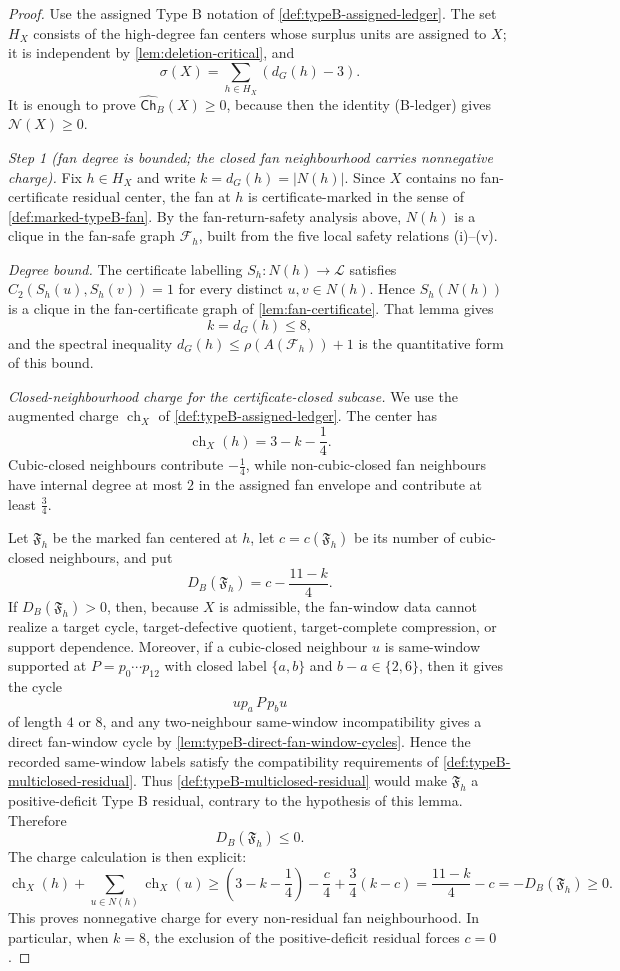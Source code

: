 \documentclass[11pt]{article}
\newcommand{\labels}{\mathcal L}
\newcommand{\ch}{\operatorname{ch}}
\newcommand{\Ch}{\mathsf{Ch}}
\newcommand{\No}{\mathcal N}
\newcommand{\Fsafe}{\mathcal F}
\begin{document}
\begin{proof}
Use the assigned Type B notation of \cref{def:typeB-assigned-ledger}.  The set
$H_X$ consists of the high-degree fan centers whose surplus units are assigned
to $X$; it is independent by \cref{lem:deletion-critical}, and
\[
\sigma(X)=\sum_{h\in H_X}(d_G(h)-3).
\]
It is enough to prove $\widehat{\Ch}_B(X)\ge0$, because then the identity
\textup{(B-ledger)} gives $\No(X)\ge0$.

\emph{Step 1 (fan degree is bounded; the closed fan neighbourhood carries nonnegative charge).}
Fix $h\in H_X$ and write $k=d_G(h)=|N(h)|$.  Since $X$ contains no
fan-certificate residual center, the fan at $h$ is certificate-marked in the
sense of \cref{def:marked-typeB-fan}.  By the fan-return-safety analysis above,
$N(h)$ is a clique in the fan-safe graph $\Fsafe_h$, built from the five local
safety relations (i)--(v).

\emph{Degree bound.}  The certificate labelling
$S_h:N(h)\to\labels$ satisfies $C_2(S_h(u),S_h(v))=1$ for every distinct
$u,v\in N(h)$.  Hence $S_h(N(h))$ is a clique in the fan-certificate graph of
\cref{lem:fan-certificate}.  That lemma gives
\[
k=d_G(h)\le 8 ,
\]
and the spectral inequality
$d_G(h)\le\rho(A(\Fsafe_h))+1$ is the quantitative form of this bound.

\emph{Closed-neighbourhood charge for the certificate-closed subcase.}  We use
the augmented charge $\ch_X$ of \cref{def:typeB-assigned-ledger}.  The center
has
\[
\ch_X(h)=3-k-\frac14.
\]
Cubic-closed neighbours contribute $-\tfrac14$, while non-cubic-closed fan
neighbours have internal degree at most $2$ in the assigned fan envelope and
contribute at least $\tfrac34$.

Let $\mathfrak F_h$ be the marked fan centered at $h$, let
$c=c(\mathfrak F_h)$ be its number of cubic-closed neighbours, and put
\[
D_B(\mathfrak F_h)=c-\frac{11-k}{4}.
\]
If $D_B(\mathfrak F_h)>0$, then, because $X$ is admissible, the fan-window data
cannot realize a target cycle, target-defective quotient, target-complete
compression, or support dependence.  Moreover, if a cubic-closed neighbour $u$ is
same-window supported at $P=p_0\cdots p_{12}$ with closed label
$\{a,b\}$ and $b-a\in\{2,6\}$, then it gives the cycle
\[
u p_a\,P\,p_b u
\]
of length $4$ or $8$, and any two-neighbour same-window incompatibility gives a
direct fan-window cycle by \cref{lem:typeB-direct-fan-window-cycles}.  Hence the
recorded same-window labels satisfy the compatibility requirements of
\cref{def:typeB-multiclosed-residual}.  Thus
\cref{def:typeB-multiclosed-residual} would make $\mathfrak F_h$ a
positive-deficit Type B residual, contrary to the hypothesis of this lemma.
Therefore
\[
D_B(\mathfrak F_h)\le0.
\]
The charge calculation is then explicit:
\[
\ch_X(h)+\sum_{u\in N(h)}\ch_X(u)
\ge
\left(3-k-\frac14\right)-\frac c4+\frac34(k-c)
=\frac{11-k}{4}-c
=-D_B(\mathfrak F_h)\ge0 .
\]
This proves nonnegative charge for every non-residual fan neighbourhood.  In
particular, when $k=8$, the exclusion of the positive-deficit residual forces
$c=0$.


\end{proof}
\end{document}
